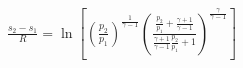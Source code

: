 \documentclass[10pt]{article}
\begin{document}
\begin{align*}\frac{s_{2}-s_{1}}{R}
=\ln
\left[
\left( \frac{p_2}{p_1} \right)^{\frac{1}{\gamma-1}}
\left( 
\frac{ 
\frac{p_2}{p_1} + \frac{\gamma+1}{\gamma-1}
}
{ 
\frac{\gamma+1}{\gamma-1} \frac{p_2}{p_1} +1
}
\right)^{\frac{\gamma}{\gamma-1}}
\right]
\end{align*}
\end{document}
